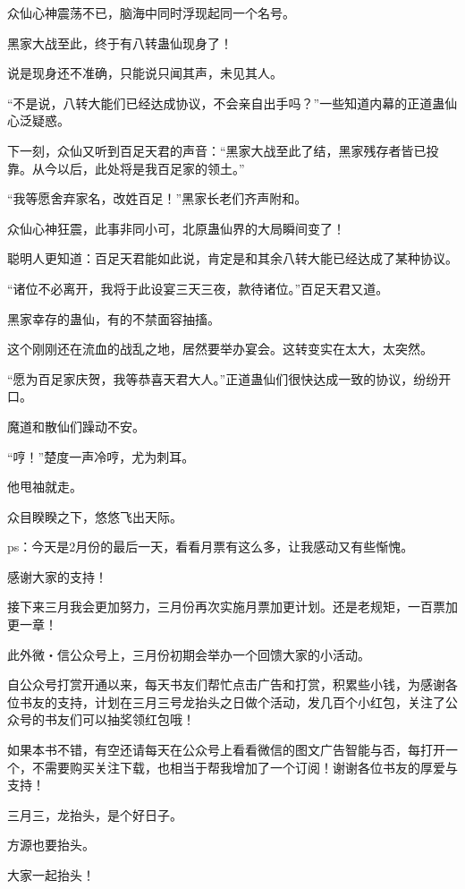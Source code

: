 \begin{this_body}
众仙心神震荡不已，脑海中同时浮现起同一个名号。

黑家大战至此，终于有八转蛊仙现身了！

说是现身还不准确，只能说只闻其声，未见其人。

“不是说，八转大能们已经达成协议，不会亲自出手吗？”一些知道内幕的正道蛊仙心泛疑惑。

下一刻，众仙又听到百足天君的声音：“黑家大战至此了结，黑家残存者皆已投靠。从今以后，此处将是我百足家的领土。”

“我等愿舍弃家名，改姓百足！”黑家长老们齐声附和。

众仙心神狂震，此事非同小可，北原蛊仙界的大局瞬间变了！

聪明人更知道：百足天君能如此说，肯定是和其余八转大能已经达成了某种协议。

“诸位不必离开，我将于此设宴三天三夜，款待诸位。”百足天君又道。

黑家幸存的蛊仙，有的不禁面容抽搐。

这个刚刚还在流血的战乱之地，居然要举办宴会。这转变实在太大，太突然。

“愿为百足家庆贺，我等恭喜天君大人。”正道蛊仙们很快达成一致的协议，纷纷开口。

魔道和散仙们躁动不安。

“哼！”楚度一声冷哼，尤为刺耳。

他甩袖就走。

众目睽睽之下，悠悠飞出天际。

ps：今天是2月份的最后一天，看看月票有这么多，让我感动又有些惭愧。

感谢大家的支持！

接下来三月我会更加努力，三月份再次实施月票加更计划。还是老规矩，一百票加更一章！

此外微・信公众号上，三月份初期会举办一个回馈大家的小活动。

自公众号打赏开通以来，每天书友们帮忙点击广告和打赏，积累些小钱，为感谢各位书友的支持，计划在三月三号龙抬头之日做个活动，发几百个小红包，关注了公众号的书友们可以抽奖领红包哦！

如果本书不错，有空还请每天在公众号上看看微信的图文广告智能与否，每打开一个，不需要购买关注下载，也相当于帮我增加了一个订阅！谢谢各位书友的厚爱与支持！

三月三，龙抬头，是个好日子。

方源也要抬头。

大家一起抬头！

\end{this_body}

